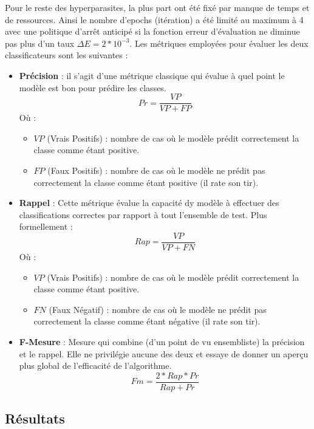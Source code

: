 	\par
	Pour le reste des hyperparasites, la plus part ont été fixé par manque de temps et de ressources. Ainsi le nombre d'epochs (itération) a été limité au maximum à 4 avec une politique d'arrêt anticipé si la fonction erreur d'évaluation ne diminue pas plus d'un taux $\Delta E = 2*10^{-3}$. Les métriques employées pour évaluer les deux classificateurs sont les suivantes : 
	\begin{itemize}
		\item \textbf{Précision} : il s'agit d'une métrique classique qui évalue à quel point le modèle est bon pour prédire les classes.
		\begin{equation*}
			Pr = \frac{VP}{VP+FP}
		\end{equation*}
		Où : 
		\begin{itemize}
			\item $VP$ (Vrais Positifs) : nombre de cas où le modèle prédit correctement la classe comme étant positive.
			\item $FP$ (Faux Positifs) : nombre de cas où le modèle ne prédit pas correctement la classe comme étant positive (il rate son tir).
		\end{itemize}

		\item \textbf{Rappel} : Cette métrique évalue la capacité dy modèle à effectuer des classifications correctes par rapport à tout l'ensemble de test. Plus formellement : 
		\begin{equation*}
		Rap = \frac{VP}{VP+FN}
		\end{equation*}
		Où : 
		\begin{itemize}
			\item $VP$ (Vrais Positifs) : nombre de cas où le modèle prédit correctement la classe comme étant positive.
			\item $FN$ (Faux Négatif) : nombre de cas où le modèle ne prédit pas correctement la classe comme étant négative (il rate son tir).
		\end{itemize}
	
		\item \textbf{F-Mesure} : Mesure qui combine (d'un point de vu ensembliste) la précision et le rappel. Elle ne privilégie aucune des deux et essaye de donner un aperçu plus global de l'efficacité de l'algorithme.
		\begin{equation*}
		Fm = \frac{2*Rap*Pr}{Rap+Pr}
		\end{equation*}
	\end{itemize}
	\subsection{Résultats}
